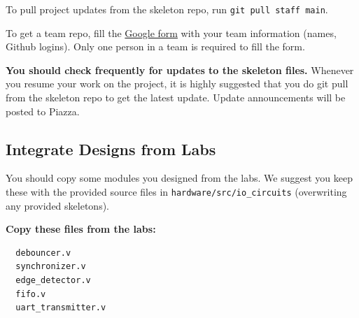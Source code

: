 \documentclass[11pt]{article}
\begin{document}
To pull project updates from the skeleton repo, run \verb|git pull staff main|.

To get a team repo, fill the \href{https://docs.google.com/forms/d/1hOJek4q_Z6SokflpH17gOESGGCXmY1VfdJ5VLMNku1U}{Google form} with your team information (names, Github logins). Only one person in a team is required to fill the form.

\textbf{You should check frequently for updates to the skeleton files.} Whenever you resume your work on the project,
it is highly suggested that you do git pull from the skeleton repo to get the latest update.
Update announcements will be posted to Piazza.

\subsection{Integrate Designs from Labs} \label{sec:past_designs}
You should copy some modules you designed from the labs.
We suggest you keep these with the provided source files in \verb|hardware/src/io_circuits| (overwriting any provided skeletons).

\textbf{Copy these files from the labs:}
\begin{verbatim}
  debouncer.v
  synchronizer.v
  edge_detector.v
  fifo.v
  uart_transmitter.v
\end{verbatim}
\end{document}

